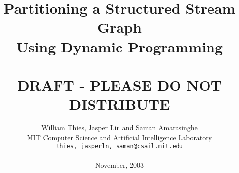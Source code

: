 \documentclass{acm_proc_article-sp}
\title{Partitioning a Structured Stream Graph \\ Using Dynamic Programming \\ ~ \\ DRAFT - PLEASE DO NOT DISTRIBUTE \vspace{-12pt}}
\author{William Thies, Jasper Lin and Saman Amarasinghe \\
  MIT Computer Science and Artificial Intelligence Laboratory\\
  \texttt{\symbol{`\{}thies, jasperln, saman\symbol{`\}}@csail.mit.edu} \\
  ~ \\
  November, 2003}
\date{}
\begin{document}
  \newtheorem{definition}{Definition}
  \newcommand{\mt}[1]{\mbox{\it #1}}
  \newcommand{\todo}[1]{\framebox{\bf #1}}
  
  \maketitle
  
  \begin{abstract}
    
  \end{abstract}

  
  
  
  
  
  
  
  \vspace{-8pt}
  

  \small
  \vspace{-8pt}
  
  


  
\end{document}
